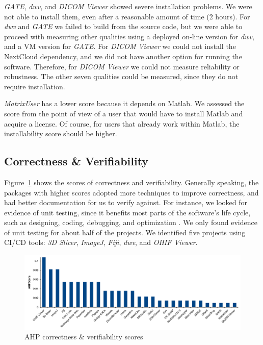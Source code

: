 \documentclass[11pt]{article}
\begin{document}
\textit{GATE}, \textit{dwv}, and \textit{DICOM Viewer} showed severe
installation problems. We were not able to install them, even after a reasonable
amount of time (2 hours).  For \textit{dwv} and \textit{GATE} we failed to build
from the source code, but we were able to proceed with measuring other qualities
using a deployed on-line version for \textit{dwv}, and a VM version for
\textit{GATE}. For \textit{DICOM Viewer} we could not install the NextCloud
dependency, and we did not have another option for running the software.
Therefore, for \textit{DICOM Viewer} we could not measure reliability or
robustness.  The other seven qualities could be measured, since they do not
require installation.

\textit{MatrixUser} has a lower score because it depends on Matlab. We assessed
the score from the point of view of a user that would have to install Matlab and
acquire a license.  Of course, for users that already work within Matlab, the
installability score should be higher.

\subsection{Correctness \& Verifiability} \label{sec_result_correctness_verifiability}

Figure~\ref{fg_correctness_verifiability_scores} shows the scores of correctness
and verifiability. Generally speaking, the packages with higher scores adopted
more techniques to improve correctness, and had better documentation for us to
verify against.  For instance, we looked for evidence of unit testing, since it
benefits most parts of the software's life cycle, such as designing, coding,
debugging, and optimization \citep{Hamill2004}.  We only found evidence of unit
testing for about half of the projects. We identified five projects using CI/CD
tools: \textit{3D Slicer}, \textit{ImageJ}, \textit{Fiji}, \textit{dwv}, and
\textit{OHIF Viewer}.

\begin{figure}[!ht]
\includegraphics[scale=0.47]{correctness_verifiability_scores.pdf}
\caption{AHP correctness \& verifiability scores}
\label{fg_correctness_verifiability_scores}
\end{figure}
\end{document}
